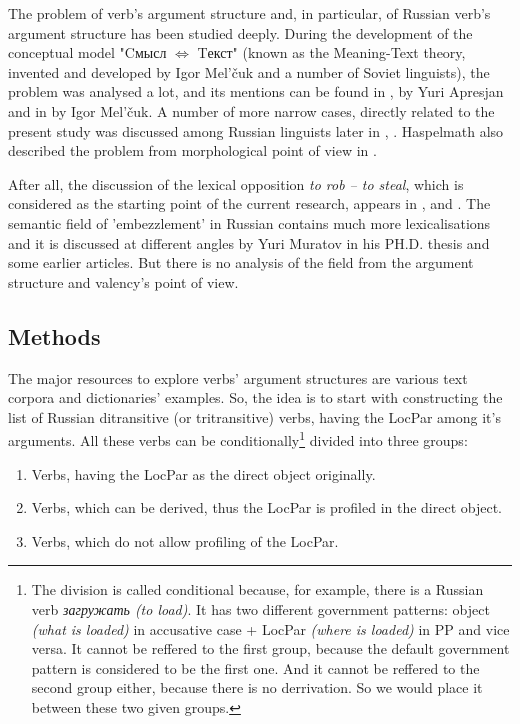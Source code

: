 The problem of verb's argument structure and, in particular, of Russian verb's argument structure has been studied deeply. During the development of the conceptual model "Cмысл $\Leftrightarrow$ Tекст" (known as the Meaning-Text theory, invented and developed by Igor Mel'{\v{c}}uk and a number of Soviet linguists), the problem was analysed a lot, and its mentions can be found in \citep[119-156]{апресян1995избранные}, \citep[129-131]{апресян1995избранные2} by Yuri Apresjan and in \citep[134–139]{мельчук1974опыт} by Igor Mel’{\v{c}}uk. A number of more narrow cases, directly related to the present study was discussed among Russian linguists later in \citep{муравенко1998случаях}, \citep{цинман1998модель}. Haspelmath also described the problem from morphological point of view in \citep{haspelmath2004valency}.

After all, the discussion of the lexical opposition \textit{to rob -- to steal}, which is considered as the starting point of the current research, appears in \citep[45-48]{goldberg1995constructions}, \citep{thorgren2005transaction} and \citep{van2007role}. The semantic field of 'embezzlement' in Russian contains much more lexicalisations and it is discussed at different angles by Yuri Muratov in his PH.D. thesis \citep{муратовгенетическая} and some earlier articles. But there is no analysis of the field from the argument structure and valency's point of view. 


\subsection{Methods}
The major resources to explore verbs' argument structures are various text corpora and dictionaries' examples. So, the idea is to start with constructing the list of Russian ditransitive (or tritransitive) verbs, having the LocPar among it's arguments. All these verbs can be conditionally\footnote{The division is called conditional because, for example, there is a  Russian verb \textit{загружать (to load)}. It has two different government patterns: object \textit{(what is loaded)} in accusative case + LocPar \textit{(where is loaded)} in PP and vice versa. It cannot be reffered to the first group, because the default government pattern is considered to be the first one. And it cannot be reffered to the second group either, because there is no derrivation. So we would place it between these two given groups.} divided into three groups:
\begin{enumerate}
    \item Verbs, having the LocPar as the direct object originally.
    \item Verbs, which can be derived, thus the LocPar is profiled in the direct object.
    \item Verbs, which do not allow profiling of the LocPar.
\end{enumerate}

